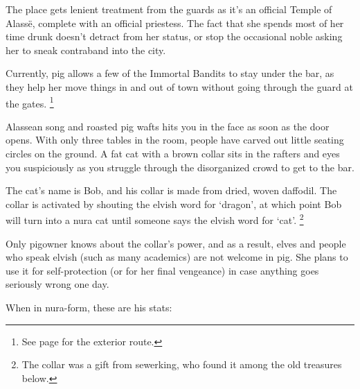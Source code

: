 \begin{multicols}{2}
The place gets lenient treatment from the guards as it's an official Temple of Alass\"{e}, complete with an official priestess.
The fact that she spends most of her time drunk doesn't detract from her status, or stop the occasional noble asking her to sneak contraband into the city.

Currently, \gls{pig} allows a few of the Immortal Bandits to stay under the bar, as they help her move things in and out of town without going through the \gls{guard} at the gates.%
\footnote{See page \pageref{farmExit} for the exterior route.}



\begin{boxtext}

  Alassean song and roasted pig wafts hits you in the face as soon as the door opens.
  With only three tables in the room, people have carved out little seating circles on the ground.
  A fat cat with a brown collar sits in the rafters and eyes you suspiciously as you struggle through the disorganized crowd to get to the bar.

\end{boxtext}

The cat's name is Bob, and his collar is made from dried, woven daffodil.  The collar is activated by shouting the elvish word for `dragon', at which point Bob will turn into a nura cat until someone says the elvish word for `cat'.%
\footnote{The collar was a gift from \gls{sewerking}, who found it among the old treasures below.}

Only \gls{pigowner} knows about the collar's power, and as a result, elves and people who speak elvish (such as many academics) are not welcome in \gls{pig}.
She plans to use it for self-protection (or for her final vengeance) in case anything goes seriously wrong one day.

When in nura-form, these are his stats:




\end{multicols}
